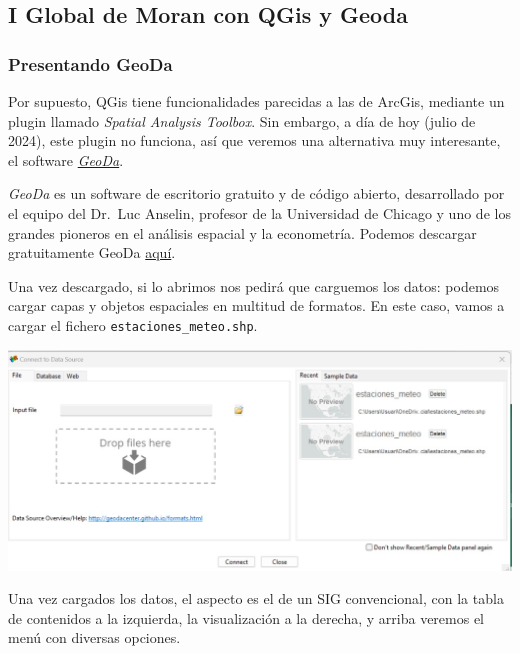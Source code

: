 \documentclass[
  letterpaper,
  DIV=11,
  numbers=noendperiod]{scrreprt}
\begin{document}
\hypertarget{i-global-de-moran-con-qgis-y-geoda}{%
\subsection{I Global de Moran con QGis y
Geoda}\label{i-global-de-moran-con-qgis-y-geoda}}

\hypertarget{presentando-geoda}{%
\subsubsection{Presentando GeoDa}\label{presentando-geoda}}

Por supuesto, QGis tiene funcionalidades parecidas a las de ArcGis,
mediante un plugin llamado \emph{Spatial Analysis Toolbox}. Sin embargo,
a día de hoy (julio de 2024), este plugin no funciona, así que veremos
una alternativa muy interesante, el software
\href{https://geodacenter.github.io/}{\emph{GeoDa}}.

\emph{GeoDa} es un software de escritorio gratuito y de código abierto,
desarrollado por el equipo del Dr.~Luc Anselin, profesor de la
Universidad de Chicago y uno de los grandes pioneros en el análisis
espacial y la econometría. Podemos descargar gratuitamente GeoDa
\href{https://geodacenter.github.io/download_windows.html}{aquí}.

Una vez descargado, si lo abrimos nos pedirá que carguemos los datos:
podemos cargar capas y objetos espaciales en multitud de formatos. En
este caso, vamos a cargar el fichero \texttt{estaciones\_meteo.shp}.

\includegraphics{images/geoda_intro.jpg}

Una vez cargados los datos, el aspecto es el de un SIG convencional, con
la tabla de contenidos a la izquierda, la visualización a la derecha, y
arriba veremos el menú con diversas opciones.
\end{document}
